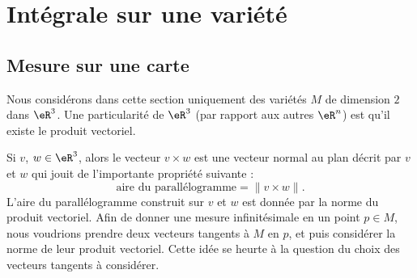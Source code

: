 \section{Intégrale sur une variété}

\subsection{Mesure sur une carte}

Nous considérons dans cette section uniquement des variétés $M$ de dimension $2$ dans $\eR^3$.  Une particularité de $\eR^3$ (par rapport aux autres $\eR^n$) est qu'il existe le produit vectoriel.

Si $v$, $w\in\eR^3$, alors le vecteur $v\times w$ est une vecteur normal au plan décrit par $v$ et $w$ qui jouit de l'importante propriété suivante :
\begin{equation}
	\text{aire du parallélogramme}=\| v\times w \|.
\end{equation}
L'aire du parallélogramme construit sur $v$ et $w$ est donnée par la norme du produit vectoriel. Afin de donner une mesure infinitésimale en un point $p\in M$, nous voudrions prendre deux vecteurs tangents à $M$ en $p$, et puis considérer la norme de leur produit vectoriel. Cette idée se heurte à la question du choix des vecteurs tangents à considérer.

